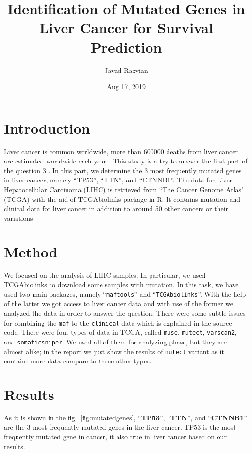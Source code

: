 \documentclass[12pt, ]{article}
\title{Identification of Mutated Genes in Liver Cancer for Survival Prediction}
\author{Javad Razvian}
\date{Aug 17, 2019}
\begin{document}
\maketitle

\section{Introduction}
Liver cancer is common worldwide, more than 600000 deaths from liver cancer are estimated worldwide each year \cite{bib:FMG}.
This study is a try to answer the first part of the question 3 \cite{bib:rtest}. In this part, we determine the 3 most frequently mutated genes in liver cancer, namely ``TP53'', ``TTN'', and ``CTNNB1''. 
The data for Liver Hepatocellular Carcinoma (LIHC)
 is retrieved from  ``The Cancer Genome Atlas" (TCGA)  with the aid of TCGAbiolinks package in R. 
It contains mutation and clinical data for liver cancer in addition to around 50 other cancers or their variations. 

\section{Method}
We focused on the analysis of LIHC samples. In particular, we used TCGAbiolinks to download some samples with mutation. 
In this task, we have used two main packages, namely ``\texttt{maftools}''\cite{bib:maftools} and ``\texttt{TCGAbiolinks}''\cite{bib:tcga}. 
With the help of the latter we got access to liver cancer data and with use of the former we analyzed the data in order to answer the question. 
There were some subtle issues for combining the \texttt{maf} to the \texttt{clinical} data which is explained in the source code. 
There were four types of data in TCGA, called \texttt{muse}, \texttt{mutect}, \texttt{varscan2}, and \texttt{somaticsniper}.
We used all of them for analyzing phase, but they are almost alike; in the report we just show the results of \texttt{mutect} variant as it 
contains more data compare to three other types. 

\section{Results}
As it is shown in the fig.~\ref{fig:mutatedgenes}, ``\textbf{TP53}'', ``\textbf{TTN}'', and ``\textbf{CTNNB1}'' are the 3 most frequently mutated genes in the liver cancer. 
TP53 is the most frequently mutated gene in cancer\cite{bib:BCSP}, it also true in liver cancer based on our results.
\end{document}
